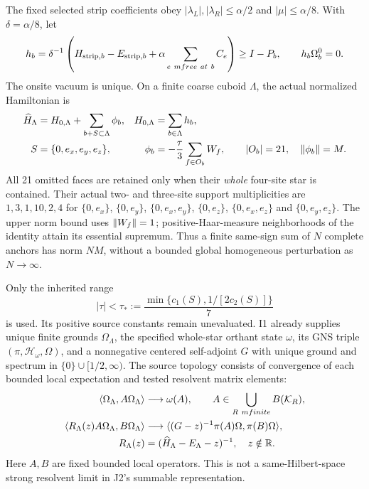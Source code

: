 The fixed selected strip coefficients obey $|\lambda_L|,|\lambda_R|\le\alpha/2$ and $|\mu|\le\alpha/8$. With $\delta=\alpha/8$, let
\begin{equation}
 h_b=\delta^{-1}\left(H_{{\rm strip},b}-E_{{\rm strip},b}
                   +\alpha\sum_{e\ {
m free\ at}\ b}C_e\right)
 \ge I-P_b,\qquad h_b\Omega_b^0=0.
 \label{eq:aj1-site}
\end{equation}
The onsite vacuum is unique. On a finite coarse cuboid $\Lambda$, the actual normalized Hamiltonian is
\begin{align}
 \widehat H_\Lambda&=H_{0,\Lambda}
       +\sum_{b+S\subset\Lambda}\phi_b,
 &H_{0,\Lambda}&=\sum_{b\in\Lambda}h_b,\notag\\
 S&=\{0,e_x,e_y,e_z\},
 &\phi_b&=-\frac\tau3\sum_{f\in O_b}W_f,
 \qquad |O_b|=21,\quad\left\lVert\phi_b\right\rVert=M.
 \label{eq:aj1-model}
\end{align}
All 21 omitted faces are retained only when their \emph{whole} four-site star is contained. Their actual two- and three-site support multiplicities are $1,3,1,10,2,4$ for $\{0,e_x\}$, $\{0,e_y\}$, $\{0,e_x,e_y\}$, $\{0,e_z\}$, $\{0,e_x,e_z\}$ and $\{0,e_y,e_z\}$. The upper norm bound uses $\left\lVert W_f\right\rVert=1$; positive-Haar-measure neighborhoods of the identity attain its essential supremum. Thus a finite same-sign sum of $N$ complete anchors has norm $NM$, without a bounded global homogeneous perturbation as $N\to\infty$.

Only the inherited range
\begin{equation}
 |\tau|<\tau_*:=\frac{\min\{c_1(S),1/[2c_2(S)]\}}7
 \label{eq:aj1-range}
\end{equation}
is used. Its positive source constants remain unevaluated. I1 already supplies unique finite grounds $\Omega_\Lambda$, the specified whole-star orthant state $\omega$, its GNS triple $(\pi,\mathcal H_\omega,\Omega)$, and a nonnegative centered self-adjoint $G$ with unique ground and spectrum in $\{0\}\cup[1/2,\infty)$. The source topology consists of convergence of each bounded local expectation and tested resolvent matrix elements:
\begin{align}
 \langle\Omega_\Lambda,A\Omega_\Lambda\rangle&\longrightarrow\omega(A),
 \qquad A\in\bigcup_{R\ {
m finite}}B(\mathcal K_R),\notag\\
 \langle R_\Lambda(z)A\Omega_\Lambda,B\Omega_\Lambda\rangle
 &\longrightarrow
 \langle(G-z)^{-1}\pi(A)\Omega,\pi(B)\Omega\rangle,\notag\\
 R_\Lambda(z)&=(\widehat H_\Lambda-E_\Lambda-z)^{-1},\quad z\notin\mathbb R.
 \label{eq:aj1-tested}
\end{align}
Here $A,B$ are fixed bounded local operators. This is not a same-Hilbert-space strong resolvent limit in J2's summable representation.

